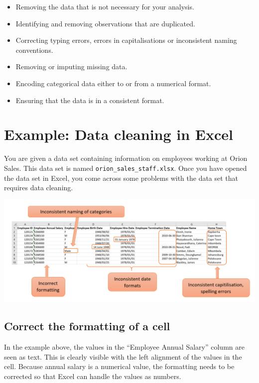 \documentclass[
]{book}
\begin{document}
\begin{itemize}
\item
  Removing the data that is not necessary for your analysis.
\item
  Identifying and removing observations that are duplicated.
\item
  Correcting typing errors, errors in capitalisations or inconsistent naming conventions.
\item
  Removing or imputing missing data.
\item
  Encoding categorical data either to or from a numerical format.
\item
  Ensuring that the data is in a consistent format.
\end{itemize}

\section*{Example: Data cleaning in Excel}\label{example-data-cleaning-in-excel}

You are given a data set containing information on employees working at Orion Sales. This data set is named \texttt{orion\_sales\_staff.xlsx}. Once you have opened the data set in Excel, you come across some problems with the data set that requires data cleaning.

\begin{center}\includegraphics[width=0.7\linewidth]{Figures/cleaning_overview} \end{center}

\subsection*{Correct the formatting of a cell}\label{correct-the-formatting-of-a-cell}

In the example above, the values in the ``Employee Annual Salary'' column are seen as text. This is clearly visible with the left alignment of the values in the cell. Because annual salary is a numerical value, the formatting needs to be corrected so that Excel can handle the values as numbers.
\end{document}
